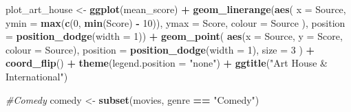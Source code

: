 \documentclass[]{article}
\newenvironment{Shaded}{\begin{snugshade}}{\end{snugshade}}
\newcommand{\CommentTok}[1]{\textcolor[rgb]{0.56,0.35,0.01}{\textit{#1}}}
\newcommand{\DataTypeTok}[1]{\textcolor[rgb]{0.13,0.29,0.53}{#1}}
\newcommand{\DecValTok}[1]{\textcolor[rgb]{0.00,0.00,0.81}{#1}}
\newcommand{\KeywordTok}[1]{\textcolor[rgb]{0.13,0.29,0.53}{\textbf{#1}}}
\newcommand{\NormalTok}[1]{#1}
\newcommand{\OperatorTok}[1]{\textcolor[rgb]{0.81,0.36,0.00}{\textbf{#1}}}
\newcommand{\StringTok}[1]{\textcolor[rgb]{0.31,0.60,0.02}{#1}}
\begin{document}
\begin{Shaded}
\begin{Highlighting}[]
\NormalTok{plot_art_house <-}\StringTok{ }\KeywordTok{ggplot}\NormalTok{(mean_score) }\OperatorTok{+}\StringTok{ }\KeywordTok{geom_linerange}\NormalTok{(}\KeywordTok{aes}\NormalTok{(}
  \DataTypeTok{x =}\NormalTok{ Source,}
  \DataTypeTok{ymin =} \KeywordTok{max}\NormalTok{(}\KeywordTok{c}\NormalTok{(}\DecValTok{0}\NormalTok{, }\KeywordTok{min}\NormalTok{(Score) }\OperatorTok{-}\StringTok{ }\DecValTok{10}\NormalTok{)),}
  \DataTypeTok{ymax =}\NormalTok{ Score,}
  \DataTypeTok{colour =}\NormalTok{ Source}
\NormalTok{),}
\DataTypeTok{position =} \KeywordTok{position_dodge}\NormalTok{(}\DataTypeTok{width =} \DecValTok{1}\NormalTok{)) }\OperatorTok{+}\StringTok{  }\KeywordTok{geom_point}\NormalTok{(}
  \KeywordTok{aes}\NormalTok{(}\DataTypeTok{x =}\NormalTok{ Source, }\DataTypeTok{y =}\NormalTok{ Score, }\DataTypeTok{colour =}\NormalTok{ Source),}
  \DataTypeTok{position =} \KeywordTok{position_dodge}\NormalTok{(}\DataTypeTok{width =} \DecValTok{1}\NormalTok{),}
  \DataTypeTok{size =} \DecValTok{3}
\NormalTok{) }\OperatorTok{+}\StringTok{ }\KeywordTok{coord_flip}\NormalTok{() }\OperatorTok{+}\StringTok{ }\KeywordTok{theme}\NormalTok{(}\DataTypeTok{legend.position =} \StringTok{"none"}\NormalTok{) }\OperatorTok{+}\StringTok{ }\KeywordTok{ggtitle}\NormalTok{(}\StringTok{"Art House & International"}\NormalTok{)}

\CommentTok{#Comedy}
\NormalTok{comedy <-}\StringTok{ }\KeywordTok{subset}\NormalTok{(movies, genre }\OperatorTok{==}\StringTok{ "Comedy"}\NormalTok{)}


\end{Highlighting}
\end{Shaded}
\end{document}
